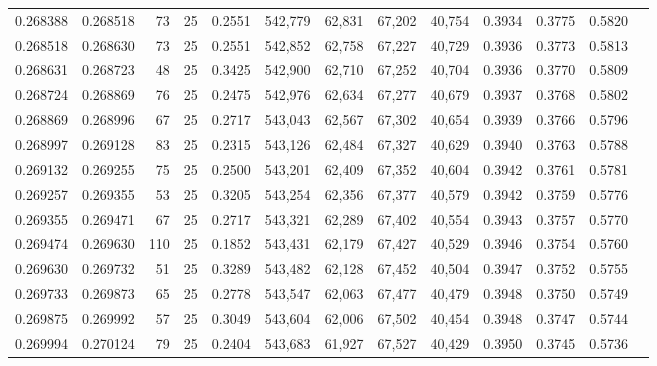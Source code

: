 \begin{tabular}{rrrrrrrrrrrrr}
0.268388 & 0.268518 &    73 &  25 &                                     0.2551 & 542,779 &  62,831 &  67,202 &  40,754 & 0.3934 & 0.3775 & 0.5820 \\
0.268518 & 0.268630 &    73 &  25 &                                     0.2551 & 542,852 &  62,758 &  67,227 &  40,729 & 0.3936 & 0.3773 & 0.5813 \\
0.268631 & 0.268723 &    48 &  25 &                                     0.3425 & 542,900 &  62,710 &  67,252 &  40,704 & 0.3936 & 0.3770 & 0.5809 \\
0.268724 & 0.268869 &    76 &  25 &                                     0.2475 & 542,976 &  62,634 &  67,277 &  40,679 & 0.3937 & 0.3768 & 0.5802 \\
0.268869 & 0.268996 &    67 &  25 &                                     0.2717 & 543,043 &  62,567 &  67,302 &  40,654 & 0.3939 & 0.3766 & 0.5796 \\
0.268997 & 0.269128 &    83 &  25 &                                     0.2315 & 543,126 &  62,484 &  67,327 &  40,629 & 0.3940 & 0.3763 & 0.5788 \\
0.269132 & 0.269255 &    75 &  25 &                                     0.2500 & 543,201 &  62,409 &  67,352 &  40,604 & 0.3942 & 0.3761 & 0.5781 \\
0.269257 & 0.269355 &    53 &  25 &                                     0.3205 & 543,254 &  62,356 &  67,377 &  40,579 & 0.3942 & 0.3759 & 0.5776 \\
0.269355 & 0.269471 &    67 &  25 &                                     0.2717 & 543,321 &  62,289 &  67,402 &  40,554 & 0.3943 & 0.3757 & 0.5770 \\
0.269474 & 0.269630 &   110 &  25 &                                     0.1852 & 543,431 &  62,179 &  67,427 &  40,529 & 0.3946 & 0.3754 & 0.5760 \\
0.269630 & 0.269732 &    51 &  25 &                                     0.3289 & 543,482 &  62,128 &  67,452 &  40,504 & 0.3947 & 0.3752 & 0.5755 \\
0.269733 & 0.269873 &    65 &  25 &                                     0.2778 & 543,547 &  62,063 &  67,477 &  40,479 & 0.3948 & 0.3750 & 0.5749 \\
0.269875 & 0.269992 &    57 &  25 &                                     0.3049 & 543,604 &  62,006 &  67,502 &  40,454 & 0.3948 & 0.3747 & 0.5744 \\
0.269994 & 0.270124 &    79 &  25 &                                     0.2404 & 543,683 &  61,927 &  67,527 &  40,429 & 0.3950 & 0.3745 & 0.5736 \\

\end{tabular}
